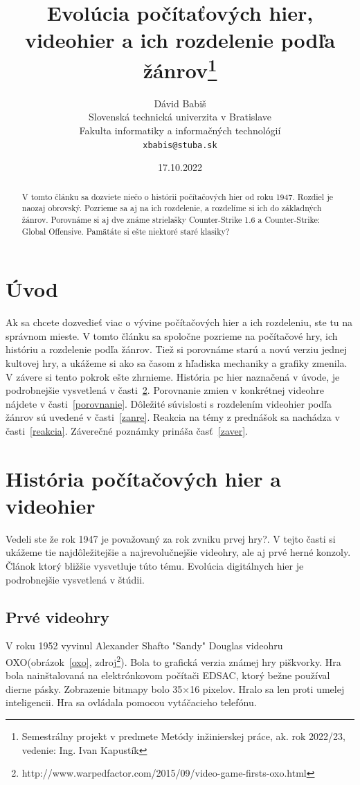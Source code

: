 \documentclass[10pt,oneside,slovak,a4paper]{article}
\title{Evolúcia počítaťových hier, videohier a ich rozdelenie podľa žánrov\thanks{Semestrálny projekt v predmete Metódy inžinierskej práce, ak. rok 2022/23, vedenie: Ing. Ivan Kapustík}} %
\author{Dávid Babiš\\[2pt]
	{\small Slovenská technická univerzita v Bratislave}\\
	{\small Fakulta informatiky a informačných technológií}\\
	{\small \texttt{xbabis@stuba.sk}}
	}
\date{\small 17.10.2022}
\begin{document}
\maketitle

\begin{abstract}
 V tomto článku sa dozviete niečo o histórii počítačových hier od roku 1947. Rozdiel je naozaj obrovský. Pozrieme sa aj na ich rozdelenie, a rozdelíme si ich do základných žánrov. Porovnáme si aj dve známe strielašky Counter-Strike 1.6 a Counter-Strike: Global Offensive. Pamätáte si ešte niektoré staré klasiky?
\end{abstract}



\section{Úvod}
Ak sa chcete dozvedieť viac o vývine počítačových hier a ich rozdeleniu, ste tu na správnom mieste. V tomto článku sa spoločne pozrieme na počítačové hry, ich históriu a rozdelenie podľa žánrov. Tiež si porovnáme starú a novú verziu jednej kultovej hry, a ukážeme si ako sa časom z hľadiska mechaniky a grafiky zmenila. V závere si tento pokrok ešte zhrnieme. História pc hier naznačená v úvode, je podrobnejšie vysvetlená v časti~\ref{historia}. Porovnanie zmien v konkrétnej videohre nájdete v časti~\ref{porovnanie}. 
Dôležité súvislosti s rozdelením videohier podľa žánrov sú uvedené v časti~\ref{zanre}. Reakcia na témy z prednášok sa nachádza v časti~\ref{reakcia}. 
Záverečné poznámky prináša časť~\ref{zaver}.

\section{História počítačových hier a videohier} \label{historia}
Vedeli ste že rok 1947 je považovaný za rok zvniku prvej hry?. V tejto časti si ukážeme tie najdôležitejšie a najrevolučnejšie videohry, ale aj prvé herné konzoly. Článok ktorý bližšie vysvetluje túto tému\cite{Lowood}. Evolúcia digitálnych hier je podrobnejšie vysvetlená v štúdii\cite{sahay}.

\subsection{Prvé videohry}

V roku 1952 vyvinul Alexander Shafto "Sandy" Douglas videohru OXO(obrázok~\ref{oxo}, zdroj\footnote{http://www.warpedfactor.com/2015/09/video-game-firsts-oxo.html}). Bola to grafická verzia známej hry piškvorky. Hra bola nainštalovaná na elektrónkovom počítači EDSAC, ktorý bežne používal dierne pásky. Zobrazenie bitmapy bolo 35×16 pixelov. Hralo sa len proti umelej inteligencii. Hra sa ovládala pomocou vytáčacieho telefónu.
\end{document}
